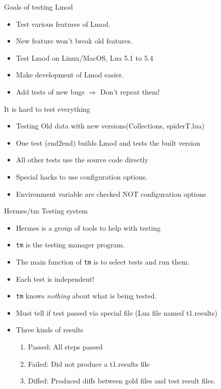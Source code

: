 \documentclass{beamer}
\begin{document}
\begin{frame}{Goals of testing Lmod}
  \begin{itemize}
    \item Test various features of Lmod.
    \item New feature won't break old features.
    \item Test Lmod on Linux/MacOS, Lua 5.1 to 5.4
    \item Make development of Lmod easier.
    \item Add tests of new bugs $\Rightarrow$ Don't repeat them!
  \end{itemize}
\end{frame}

\begin{frame}{It is hard to test everything}
  \begin{itemize}
    \item Testing Old data with new versions(Collections, spiderT.lua)
    \item One test (end2end) builds Lmod and tests the built version
    \item All other tests use the source code directly
    \item Special hacks to use configuration options. 
    \item Environment variable are checked NOT configuration options
  \end{itemize}
\end{frame}

\begin{frame}{Hermes/tm Testing system}
  \begin{itemize}
    \item Hermes is a group of tools to help with testing
    \item \texttt{tm} is the testing manager program.
    \item The main function of \texttt{tm} is to select tests and run them.
    \item Each test is independent!
    \item \texttt{tm} knows \emph{nothing} about what is being tested.
    \item Must tell if test passed via special file (Lua file named
      t1.results)
    \item Three kinds of results
      \begin{enumerate}
        \item Passed: All steps passed
        \item Failed: Did not produce a t1.results file
        \item Diffed: Produced diffs between gold files and test
          result files.
      \end{enumerate}
  \end{itemize}
\end{frame}
\end{document}
